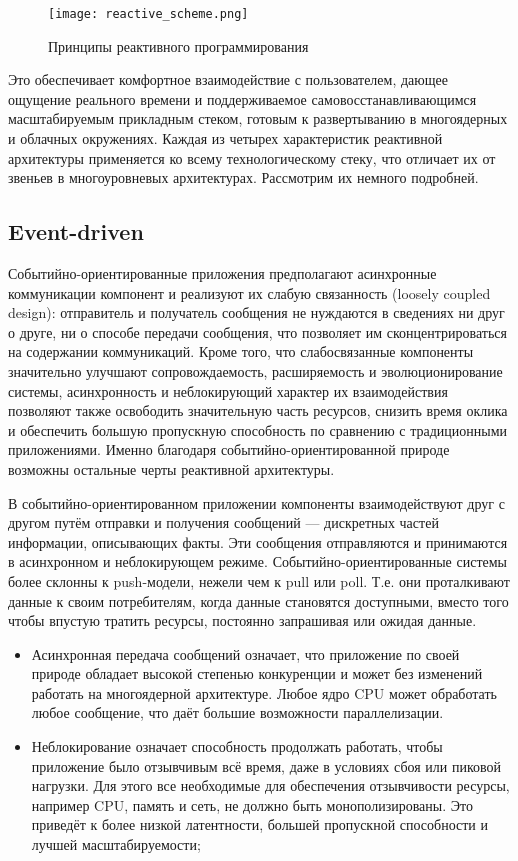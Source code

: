 \begin{figure}[ht]
\centering
  \texttt{[image: reactive\_scheme.png]}
  \caption{ Принципы реактивного программирования }
  \label{fig:reactive_scheme}
\end{figure}

Это обеспечивает комфортное взаимодействие с пользователем, дающее ощущение реального времени и поддерживаемое самовосстанавливающимся масштабируемым прикладным стеком, готовым к развертыванию в многоядерных и облачных окружениях. Каждая из четырех характеристик реактивной архитектуры применяется ко всему технологическому стеку, что отличает их от звеньев в многоуровневых архитектурах. Рассмотрим их немного подробней.

\subsection{Event-driven}
\label{subsub:domain:reactive_programming:event_driven}

Событийно-ориентированные приложения предполагают асинхронные коммуникации компонент и реализуют их слабую связанность (loosely coupled design): отправитель и получатель сообщения не нуждаются в сведениях ни друг о друге, ни о способе передачи сообщения, что позволяет им сконцентрироваться на содержании коммуникаций. Кроме того, что слабосвязанные компоненты значительно улучшают сопровождаемость, расширяемость и эволюционирование системы, асинхронность и неблокирующий характер их взаимодействия позволяют также освободить значительную часть ресурсов, снизить время оклика и обеспечить большую пропускную способность по сравнению с традиционными приложениями. Именно благодаря событийно-ориентированной природе возможны остальные черты реактивной архитектуры.

В событийно-ориентированном приложении компоненты взаимодействуют друг с другом путём отправки и получения сообщений --- дискретных частей информации, описывающих факты. Эти сообщения отправляются и принимаются в асинхронном и неблокирующем режиме. Событийно-ориентированные системы более склонны к push-модели, нежели чем к pull или poll. Т.е. они проталкивают данные к своим потребителям, когда данные становятся доступными, вместо того чтобы впустую тратить ресурсы, постоянно запрашивая или ожидая данные.

\begin{itemize}
  \item Асинхронная передача сообщений означает, что приложение по своей природе обладает высокой степенью конкуренции и может без изменений работать на многоядерной архитектуре. Любое ядро CPU может обработать любое сообщение, что даёт большие возможности параллелизации.
  \item Неблокирование означает способность продолжать работать, чтобы приложение было отзывчивым всё время, даже в условиях сбоя или пиковой нагрузки. Для этого все необходимые для обеспечения отзывчивости ресурсы, например CPU, память и сеть, не должно быть монополизированы. Это приведёт к более низкой латентности, большей пропускной способности и лучшей масштабируемости;
\end{itemize}

